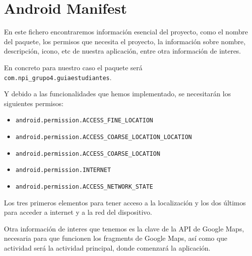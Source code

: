 
\section{Android Manifest}

En este fichero\cite{androidManifest} encontraremos información esencial del proyecto, como el nombre del paquete, los permisos que necesita el proyecto\cite{permisosManifest}, la información sobre nombre, descripción, icono, etc de nuestra aplicación, entre otra información de interes.

En concreto para nuestro caso el paquete será \texttt{com.npi\_grupo4.guiaestudiantes}.

Y debido a las funcionalidades que hemos implementado, se necesitarán los siguientes permisos:

\begin{itemize}

	\item \texttt{android.permission.ACCESS\_FINE\_LOCATION}
	\item \texttt{android.permission.ACCESS\_COARSE\_LOCATION\_LOCATION}
	\item \texttt{android.permission.ACCESS\_COARSE\_LOCATION}
	\item \texttt{android.permission.INTERNET}
	\item \texttt{android.permission.ACCESS\_NETWORK\_STATE}

\end{itemize}

Los tres primeros elementos para tener acceso a la localización y los dos últimos para acceder a internet y a la red del dispositivo.

Otra información de interes que tenemos es la clave de la API de Google Maps, necesaria para que funcionen los fragments de Google Maps, así como que actividad será la actividad principal, donde comenzará la aplicación.



